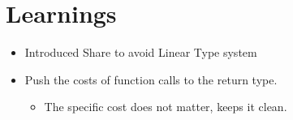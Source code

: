 \section{Learnings}
\begin{itemize}
	\item Introduced Share to avoid Linear Type system
	\item Push the costs of function calls to the return type. 
	   \begin{itemize}
	   	\item The specific cost does not matter, keeps it clean.
	   \end{itemize}
\end{itemize}
